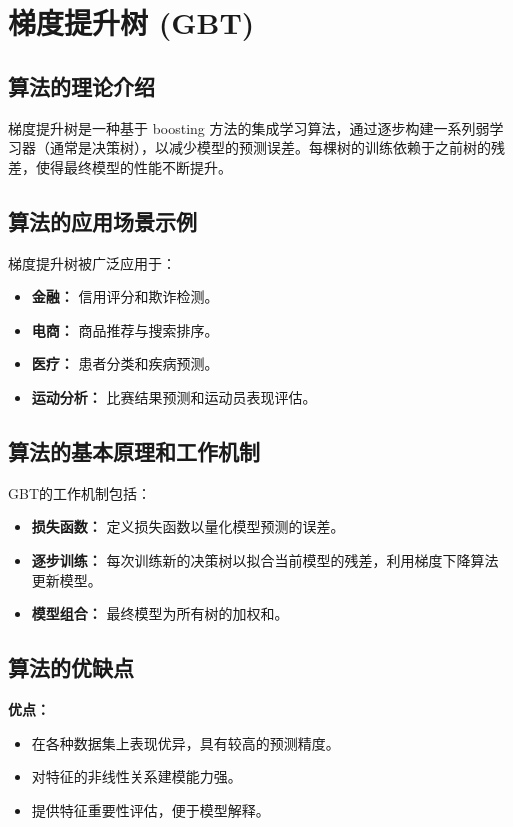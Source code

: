 \section{梯度提升树 (GBT)}
\subsection*{算法的理论介绍}
梯度提升树是一种基于 boosting 方法的集成学习算法，通过逐步构建一系列弱学习器（通常是决策树），以减少模型的预测误差。每棵树的训练依赖于之前树的残差，使得最终模型的性能不断提升。

\subsection*{算法的应用场景示例}
梯度提升树被广泛应用于：
\begin{itemize}
    \item \textbf{金融：} 信用评分和欺诈检测。
    \item \textbf{电商：} 商品推荐与搜索排序。
    \item \textbf{医疗：} 患者分类和疾病预测。
    \item \textbf{运动分析：} 比赛结果预测和运动员表现评估。
\end{itemize}

\subsection*{算法的基本原理和工作机制}
GBT的工作机制包括：
\begin{itemize}
    \item \textbf{损失函数：} 定义损失函数以量化模型预测的误差。
    \item \textbf{逐步训练：} 每次训练新的决策树以拟合当前模型的残差，利用梯度下降算法更新模型。
    \item \textbf{模型组合：} 最终模型为所有树的加权和。
\end{itemize}

\subsection*{算法的优缺点}
\textbf{优点：}
\begin{itemize}
    \item 在各种数据集上表现优异，具有较高的预测精度。
    \item 对特征的非线性关系建模能力强。
    \item 提供特征重要性评估，便于模型解释。
\end{itemize}

